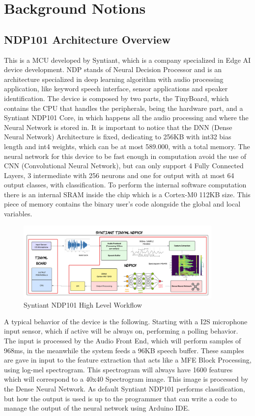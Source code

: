 \chapter{Background Notions}
\label{cha:background}

\section{NDP101 Architecture Overview}
\label{sec:architecture}
This is a MCU developed by Syntiant\cite{description_ndp101}, which is a company specialized in Edge AI device development. NDP stands of Neural Decision Processor and is an architecture specialized in deep learning algorithm with audio processing application, like keyword speech interface, sensor applications and speaker identification. The device is composed by two parts, the TinyBoard, which contains the CPU that handles the peripherals, being the hardware part, and a Syntiant NDP101 Core, in which happens all the audio processing and where the Neural Network is stored in. It is important to notice that the DNN (Dense Neural Network) Architecture is fixed, dedicating to 256KB with int32 bias length and int4 weights, which can be at most 589.000, with a total memory. The neural network for this device to be fast enough in computation avoid the use of CNN (Convolutional Neural Network), but can only support 4 Fully Connected Layers, 3 intermediate with 256 neurons and one for output with at most 64 output classes, with classification. To perform the internal software computation there is an internal SRAM inside the chip which is a Cortex-M0 112KB size. This piece of memory contains the binary user's code alongside the global and local variables.
\begin{figure}[!h]
    \centering
        \includegraphics[width=0.9\textwidth]{images/2.01 NDP101 High Level Workflow.png}
        \caption{Syntiant NDP101 High Level Workflow}
\end{figure}
\newline A typical behavior of the device is the following. Starting with a I2S microphone input sensor, which if active will be always on, performing a polling behavior. The input is processed by the Audio Front End, which will perform samples of 968ms, in the meanwhile the system feeds a 96KB speech buffer. These samples are gave in input to the feature extraction that acts like a MFE Block Processing\cite{syntiant_audio_block}, using log-mel spectrogram. This spectrogram will always have 1600 features which will correspond to a 40x40 Spectrogram image. This image is processed by the Dense Neural Network. As default Syntiant NDP101 performs classification, but how the output is used is up to the programmer that can write a code to manage the output of the neural network using Arduino IDE. 
